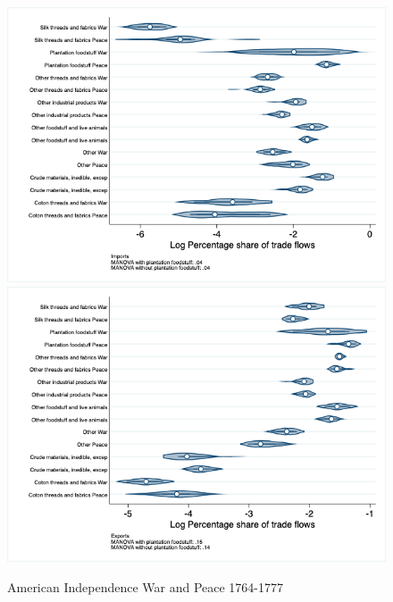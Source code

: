 \documentclass[12pt,a4paper,notitlepage,english]{article}
\begin{document}
\begin{appendix}
\begin{figure}[h!]
\centering
\caption{American Independence War and Peace 1764-1777}
\label{peace1764_1777_indep_nat_distr_aggr}
\includegraphics[scale=.4]{peace1764_1777_indep_nat_distr_Iaggr}
\includegraphics[scale=.4]{peace1764_1777_indep_nat_distr_Xaggr}
\end{figure}


\end{appendix}
\end{document}
